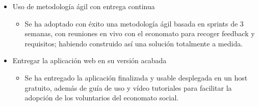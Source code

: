 \begin{itemize}
    \item Uso de metodología ágil con entrega continua
    \begin{itemize}
        \item Se ha adoptado con éxito una metodología ágil basada en sprints de 3 semanas, con reuniones en vivo con el economato para recoger feedback y requisitos; habiendo construido así una solución totalmente a medida.
    \end{itemize}
    \item Entregar la aplicación web en su versión acabada
    \begin{itemize}
        \item Se ha entregado la aplicación finalizada y usable desplegada en un host gratuito, además de guía de uso y vídeo tutoriales para facilitar la adopción de los voluntarios del economato social.
    \end{itemize}
\end{itemize}
